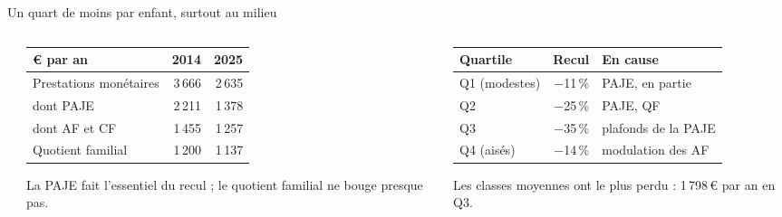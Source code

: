\documentclass[10pt,aspectratio=169]{beamer}
\begin{document}
\begin{frame}{Un quart de moins par enfant, surtout au milieu}
  \begin{columns}[T]
    \begin{column}{0.25\textwidth}
      \vspace{0.2cm}
    \end{column}
    \begin{column}{0.34\textwidth}
      \scriptsize\setlength{\tabcolsep}{3pt}
      \begin{tabular}{@{}lrr@{}}
        \toprule
        € par an & 2014 & 2025 \\
        \midrule
        Prestations monétaires & 3\,666 & 2\,635 \\
        \quad dont PAJE & 2\,211 & 1\,378 \\
        \quad dont AF et CF & 1\,455 & 1\,257 \\
        Quotient familial & 1\,200 & 1\,137 \\
        \bottomrule
      \end{tabular}
      \vspace{0.25cm}

      \footnotesize\RaggedRight La PAJE fait l'essentiel du recul ; le quotient familial ne bouge presque pas.
    \end{column}
    \begin{column}{0.37\textwidth}
      \scriptsize\setlength{\tabcolsep}{3pt}
      \begin{tabular}{@{}lrl@{}}
        \toprule
        Quartile & Recul & En cause \\
        \midrule
        Q1 (modestes) & $-$11\,\% & PAJE, en partie \\
        Q2 & $-$25\,\% & PAJE, QF \\
        Q3 & $-$35\,\% & plafonds de la PAJE \\
        Q4 (aisés) & $-$14\,\% & modulation des AF \\
        \bottomrule
      \end{tabular}
      \vspace{0.25cm}

      \footnotesize\RaggedRight Les classes moyennes ont le plus perdu : 1\,798\,€ par an en Q3.
    \end{column}
  \end{columns}
\end{frame}
\end{document}
